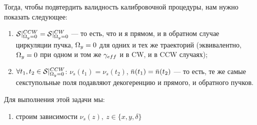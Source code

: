 Тогда, чтобы подвтердить валидность калибровочной процедуры, нам нужно показать следующее:
\begin{enumerate}
\item $\Stab*^{CCW} = \Stab*^{CW}$ --- то есть, что и я прямом, и в обратном случае циркуляции пучка,
  $\Omega_y = 0$ для одних и тех же траекторий (эквивалентно, $\Omega_y=0$ при одном и том же $\g*$ и в CW, и в CCW
  случаях);
\item $\forall t_1,t_2\in\Stab*^{CCW}$: $\nu_s(t_1) = \nu_s(t_2)$, $\bar n(t_1) = \bar n(t_2)$ ---
  то есть, те же самые секступольные поля подавляют декогеренцию и прямого, и обратного пучков.
\end{enumerate}

Для выполнения этой задачи мы:
\begin{enumerate}
\item строим зависимости $\nu_s(z),~z\in\{x,y,\delta\}$
\end{enumerate}






